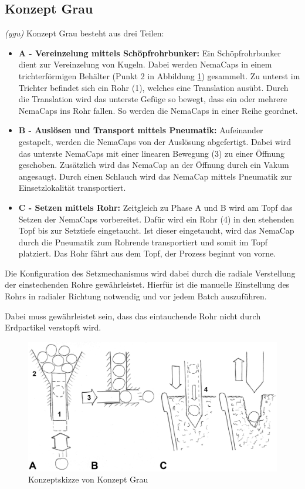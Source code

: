 \subsection{Konzept Grau}
\textit{(ygu)} Konzept Grau besteht aus drei Teilen:
\begin{itemize}
	\item \textbf{A - Vereinzelung mittels Schöpfrohrbunker:}
	Ein Schöpfrohrbunker dient zur Vereinzelung von Kugeln. Dabei werden NemaCaps in einem trichterförmigen Behälter (Punkt 2 in Abbildung \ref{fig:konzept_grau}) gesammelt. Zu unterst im Trichter befindet sich ein Rohr (1), welches eine Translation ausübt. Durch die Translation wird das unterste Gefüge so bewegt, dass ein oder mehrere NemaCaps ins Rohr fallen. So werden die NemaCaps in einer Reihe geordnet.
	
	\item \textbf{B - Auslösen und Transport mittels Pneumatik:}
	Aufeinander gestapelt, werden die NemaCaps von der Auslösung abgefertigt. Dabei wird das unterste NemaCaps mit einer linearen Bewegung (3) zu einer Öffnung geschoben. Zusätzlich wird das NemaCap an der Öffnung durch ein Vakum angesaugt. Durch einen Schlauch wird das NemaCap mittels Pneumatik zur Einsetzlokalität transportiert. 
	
	\item \textbf{C - Setzen mittels Rohr:}
	Zeitgleich zu Phase A und B wird am Topf das Setzen der NemaCaps vorbereitet. Dafür wird ein Rohr (4) in den stehenden Topf bis zur Setztiefe eingetaucht. Ist dieser eingetaucht, wird das NemaCap durch die Pneumatik zum Rohrende transportiert und somit im Topf platziert. Das Rohr fährt aus dem Topf, der Prozess beginnt von vorne.
\end{itemize}

Die Konfiguration des Setzmechanismus wird dabei durch die radiale Verstellung der einstechenden Rohre gewährleistet. Hierfür ist die manuelle Einstellung des Rohrs in radialer Richtung notwendig und vor jedem Batch auszuführen.

Dabei muss gewährleistet sein, dass das eintauchende Rohr nicht durch Erdpartikel verstopft wird.
\begin{figure}[H]
	\includegraphics[scale=0.54]{Illustrationen/5-Konzept/grau_Konzept.jpg}
	\caption{Konzeptskizze von Konzept Grau}
	\label{fig:konzept_grau}
\end{figure}
